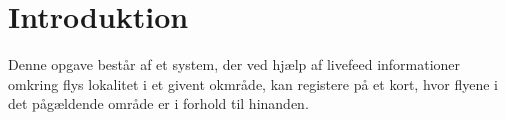 \section{Introduktion}

Denne opgave består af et system, der ved hjælp af livefeed informationer omkring flys lokalitet i et givent okmråde, kan registere på et kort, hvor flyene i det pågældende område er i forhold til hinanden. 

